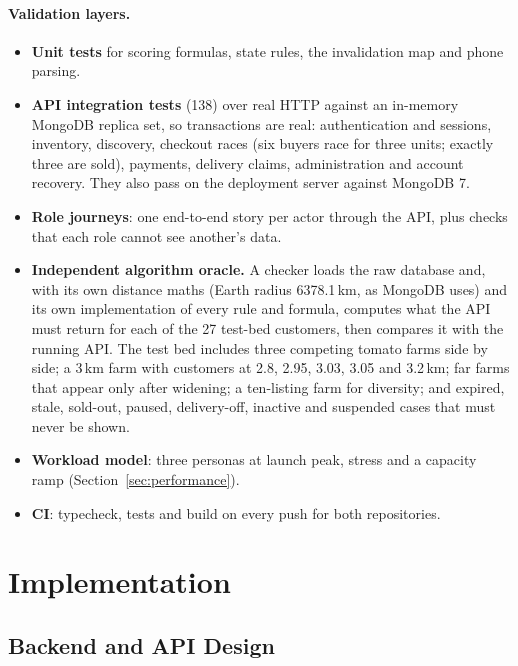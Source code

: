 \documentclass[manuscript,screen,review]{acmart}
\begin{document}
\paragraph{Validation layers.}
\begin{itemize}
  \item \textbf{Unit tests} for scoring formulas, state rules, the invalidation map and phone parsing.
  \item \textbf{API integration tests} (138) over real HTTP against an in-memory MongoDB replica set, so transactions are real: authentication and sessions, inventory, discovery, checkout races (six buyers race for three units; exactly three are sold), payments, delivery claims, administration and account recovery. They also pass on the deployment server against MongoDB 7.
  \item \textbf{Role journeys}: one end-to-end story per actor through the API, plus checks that each role cannot see another's data.
  \item \textbf{Independent algorithm oracle.} A checker loads the raw database and, with its own distance maths (Earth radius 6378.1\,km, as MongoDB uses) and its own implementation of every rule and formula, computes what the API must return for each of the 27 test-bed customers, then compares it with the running API. The test bed includes three competing tomato farms side by side; a 3\,km farm with customers at 2.8, 2.95, 3.03, 3.05 and 3.2\,km; far farms that appear only after widening; a ten-listing farm for diversity; and expired, stale, sold-out, paused, delivery-off, inactive and suspended cases that must never be shown.
  \item \textbf{Workload model}: three personas at launch peak, stress and a capacity ramp (Section~\ref{sec:performance}).
  \item \textbf{CI}: typecheck, tests and build on every push for both repositories.
\end{itemize}

\section{Implementation}
\label{sec:implementation}

\subsection{Backend and API Design}
\label{sec:backend}
\end{document}
